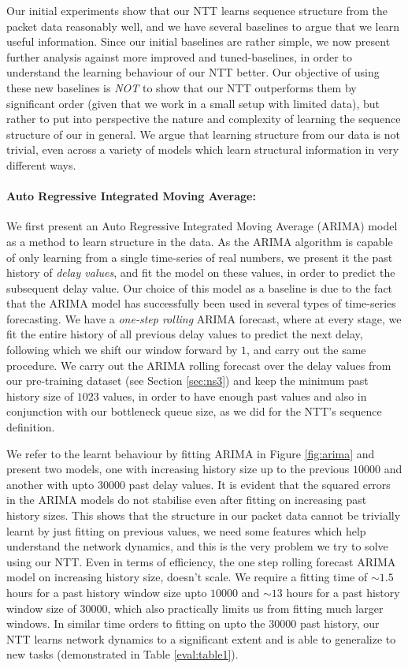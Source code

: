 Our initial experiments show that our NTT learns sequence structure from the packet data reasonably well, and we have several baselines to argue that we learn useful information. Since our initial baselines are rather simple, we now present further analysis against more improved and tuned-baselines, in order to understand the learning behaviour of our NTT better. Our objective of using these new baselines is \emph{NOT} to show that our NTT outperforms them by significant order (given that we work in a small setup with limited data), but rather to put into perspective the nature and complexity of learning the sequence structure of our in general. We argue that learning structure from our data is not trivial, even across a variety of models which learn structural information in very different ways.

\paragraph*{Auto Regressive Integrated Moving Average:}

We first present an Auto Regressive Integrated Moving Average (ARIMA)\cite{arima} model as a method to learn structure in the data. As the ARIMA algorithm is capable of only learning from a single time-series of real numbers, we present it the past history of \emph{delay values}, and fit the model on these values, in order to predict the subsequent delay value. Our choice of this model as a baseline is due to the fact that the ARIMA  model has successfully been used in several types of time-series forecasting\cite{arimasuc}. We have a \emph{one-step rolling} ARIMA forecast, where at every stage, we fit the entire history of all previous delay values to predict the next delay, following which we shift our window forward by $1$, and carry out the same procedure. We carry out the ARIMA rolling forecast over the delay values from our pre-training dataset (see Section \ref{sec:ns3}) and keep the minimum past history size of $1023$ values, in order to have enough past values and also in conjunction with our bottleneck queue size, as we did for the NTT's sequence definition.

We refer to the learnt behaviour by fitting ARIMA in Figure \ref{fig:arima} and present two models, one with increasing history size up to the previous $10000$ and another with upto $30000$ past delay values. It is evident that the squared errors in the ARIMA models do not stabilise even after fitting on increasing past history sizes. This shows that the structure in our packet data cannot be trivially learnt by just fitting on previous values, we need some features which help understand the network dynamics, and this is the very problem we try to solve using our NTT. Even in terms of efficiency, the one step rolling forecast ARIMA model on increasing history size, doesn't scale. We require a fitting time of ${\sim}1.5$ hours for a past history window size upto $10000$ and ${\sim}13$ hours for a past history window size of $30000$, which also practically limits us from fitting much larger windows. In similar time orders to fitting on upto the $30000$ past history, our NTT learns network dynamics to a significant extent and is able to generalize to new tasks (demonstrated in Table \ref{eval:table1}).

